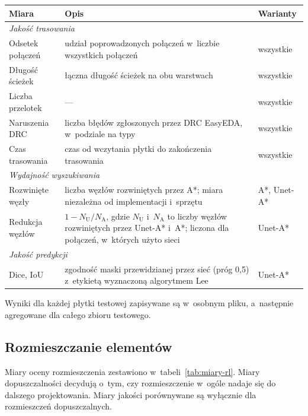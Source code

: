 \begin{table}[ht]
\label{tab:miary}
\centering\footnotesize%
\begin{tabular}{p{} p{} p{}}
\toprule
Miara & Opis & Warianty \\
\midrule
\multicolumn{3}{l}{\emph{Jakość trasowania}} \\
\midrule
Odsetek połączeń & udział poprowadzonych połączeń w~liczbie wszystkich
  połączeń & wszystkie \\
  \midrule
Długość ścieżek & łączna długość ścieżek na obu warstwach & wszystkie \\
\midrule
Liczba przelotek & --- & wszystkie \\
\midrule
Naruszenia DRC & liczba błędów zgłoszonych przez DRC EasyEDA, w~podziale
  na typy & wszystkie \\
  \midrule
Czas trasowania & czas od wczytania płytki do zakończenia trasowania
  & wszystkie \\
\midrule
\multicolumn{3}{l}{\emph{Wydajność wyszukiwania}} \\
\midrule
Rozwinięte węzły & liczba węzłów rozwiniętych przez A*; miara niezależna
  od implementacji i~sprzętu & A*, Unet-A* \\
  \midrule
Redukcja węzłów & $1 - N_{\mathrm{U}} / N_{\mathrm{A}}$, gdzie
  $N_{\mathrm{U}}$ i~$N_{\mathrm{A}}$ to liczby węzłów rozwiniętych przez
  Unet-A* i~A*; liczona dla połączeń, w~których użyto sieci & Unet-A* \\
\midrule
\multicolumn{3}{l}{\emph{Jakość predykcji}} \\
\midrule
Dice, IoU & zgodność maski przewidzianej przez sieć (próg 0{,}5)
  z~etykietą wyznaczoną algorytmem Lee & Unet-A* \\
\bottomrule
\end{tabular}
\end{table}

Wyniki dla każdej płytki testowej zapisywane są w~osobnym pliku, a~następnie
agregowane dla całego zbioru testowego.

\subsection{Rozmieszczanie elementów}
\label{sec:miary-rozmieszczanie}

Miary oceny rozmieszczenia zestawiono w~tabeli~\ref{tab:miary-rl}.
Miary dopuszczalności decydują o~tym, czy rozmieszczenie w~ogóle nadaje się
do dalszego projektowania. Miary jakości porównywane są wyłącznie dla
rozmieszczeń dopuszczalnych.

